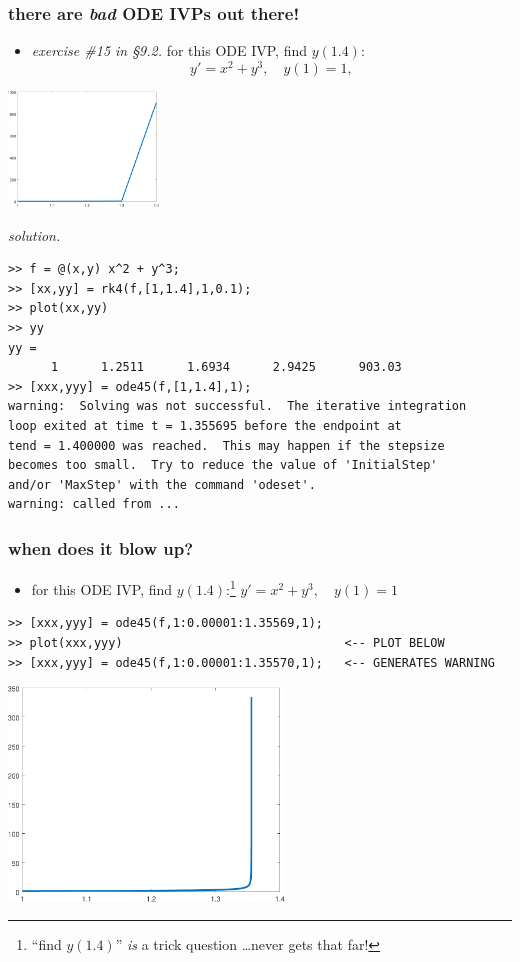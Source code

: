 \documentclass[urlcolor=blue,dvipsnames]{beamer}
\begin{document}
\begin{frame}[fragile]
\frametitle{there are \emph{bad} ODE IVPs out there!}

\begin{itemize}
\item \emph{exercise \#15 in \S9.2.}  for this ODE IVP, find $y(1.4)$:
    $$y' = x^2 + y^3, \quad y(1)=1,$$
\end{itemize}

\hfill \includegraphics[width=0.3\textwidth]{figs/blowuprk4}

\vspace{-20mm}
\noindent \emph{solution.}
\begin{Verbatim}[fontsize=\footnotesize]
>> f = @(x,y) x^2 + y^3;
>> [xx,yy] = rk4(f,[1,1.4],1,0.1);
>> plot(xx,yy)
>> yy
yy =
      1      1.2511      1.6934      2.9425      903.03
>> [xxx,yyy] = ode45(f,[1,1.4],1);
warning:  Solving was not successful.  The iterative integration
loop exited at time t = 1.355695 before the endpoint at
tend = 1.400000 was reached.  This may happen if the stepsize
becomes too small.  Try to reduce the value of 'InitialStep'
and/or 'MaxStep' with the command 'odeset'.
warning: called from ...
\end{Verbatim}

\end{frame}


\begin{frame}[fragile]
\frametitle{when does it blow up?}

\begin{itemize}
\item for this ODE IVP, find $y(1.4)$:\footnote{``find $y(1.4)$'' \emph{is} a trick question \dots never gets that far!} \quad $y' = x^2 + y^3, \quad y(1)=1$
\end{itemize}

\begin{Verbatim}[fontsize=\footnotesize]
>> [xxx,yyy] = ode45(f,1:0.00001:1.35569,1);
>> plot(xxx,yyy)                               <-- PLOT BELOW
>> [xxx,yyy] = ode45(f,1:0.00001:1.35570,1);   <-- GENERATES WARNING
\end{Verbatim}

\hfill \includegraphics[width=0.55\textwidth]{figs/blowupode45}
\end{frame}
\end{document}
